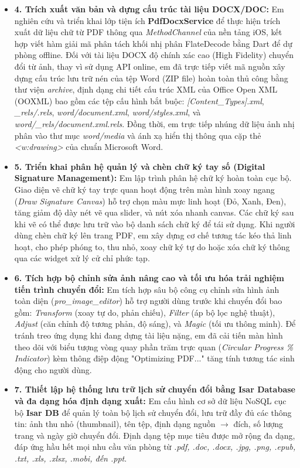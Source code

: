 \documentclass[12pt, a4paper]{article}
\begin{document}
\begin{itemize}
    \item \textbf{4. Trích xuất văn bản và dựng cấu trúc tài liệu DOCX/DOC:}
    Em nghiên cứu và triển khai lớp tiện ích \textbf{PdfDocxService} để thực hiện trích xuất dữ liệu chữ từ PDF thông qua \textit{MethodChannel} của nền tảng iOS, kết hợp viết hàm giải mã phân tách khối nhị phân FlateDecode bằng Dart để dự phòng offline. Đối với tài liệu DOCX độ chính xác cao (High Fidelity) chuyển đổi từ ảnh, thay vì sử dụng API online, em đã trực tiếp viết mã nguồn xây dựng cấu trúc lưu trữ nén của tệp Word (ZIP file) hoàn toàn thủ công bằng thư viện \textit{archive}, định dạng chi tiết cấu trúc XML của Office Open XML (OOXML) bao gồm các tệp cấu hình bắt buộc: \textit{[Content\_Types].xml}, \textit{\_rels/.rels}, \textit{word/document.xml}, \textit{word/styles.xml}, và \textit{word/\_rels/document.xml.rels}. Đồng thời, em trực tiếp nhúng dữ liệu ảnh nhị phân vào thư mục \textit{word/media} và ánh xạ hiển thị thông qua cặp thẻ \textit{<w:drawing>} của chuẩn Microsoft Word.

    \item \textbf{5. Triển khai phân hệ quản lý và chèn chữ ký tay số (Digital Signature Management):}
    Em lập trình phân hệ chữ ký hoàn toàn cục bộ. Giao diện vẽ chữ ký tay trực quan hoạt động trên màn hình xoay ngang (\textit{Draw Signature Canvas}) hỗ trợ chọn màu mực linh hoạt (Đỏ, Xanh, Đen), tăng giảm độ dày nét vẽ qua slider, và nút xóa nhanh canvas. Các chữ ký sau khi vẽ có thể được lưu trữ vào bộ danh sách chữ ký để tái sử dụng. Khi người dùng chèn chữ ký lên trang PDF, em xây dựng cơ chế tương tác kéo thả linh hoạt, cho phép phóng to, thu nhỏ, xoay chữ ký tự do hoặc xóa chữ ký thông qua các widget xử lý cử chỉ phức tạp.

    \item \textbf{6. Tích hợp bộ chỉnh sửa ảnh nâng cao và tối ưu hóa trải nghiệm tiến trình chuyển đổi:}
    Em tích hợp sâu bộ công cụ chỉnh sửa hình ảnh toàn diện (\textit{pro\_image\_editor}) hỗ trợ người dùng trước khi chuyển đổi bao gồm: \textit{Transform} (xoay tự do, phản chiếu), \textit{Filter} (áp bộ lọc nghệ thuật), \textit{Adjust} (căn chỉnh độ tương phản, độ sáng), và \textit{Magic} (tối ưu thông minh). Để tránh treo ứng dụng khi đang dựng tài liệu nặng, em đã cải tiến màn hình theo dõi với biểu tượng vòng quay phần trăm trực quan (\textit{Circular Progress \% Indicator}) kèm thông điệp động "Optimizing PDF..." tăng tính tương tác sinh động cho người dùng.

    \item \textbf{7. Thiết lập hệ thống lưu trữ lịch sử chuyển đổi bằng Isar Database và đa dạng hóa định dạng xuất:}
    Em cấu hình cơ sở dữ liệu NoSQL cục bộ \textbf{Isar DB} để quản lý toàn bộ lịch sử chuyển đổi, lưu trữ đầy đủ các thông tin: ảnh thu nhỏ (thumbnail), tên tệp, định dạng nguồn $\rightarrow$ đích, số lượng trang và ngày giờ chuyển đổi. Định dạng tệp mục tiêu được mở rộng đa dạng, đáp ứng hầu hết mọi nhu cầu văn phòng từ \textit{.pdf, .doc, .docx, .jpg, .png, .epub, .txt, .xls, .xlsx, .mobi, đến .ppt}.
\end{itemize}
\end{document}
